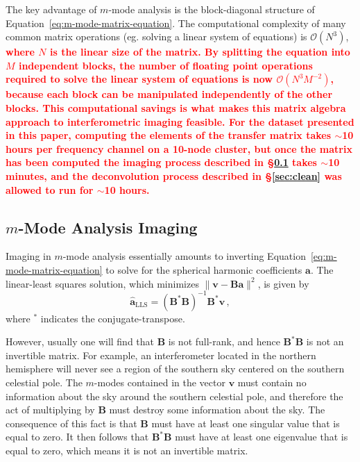 \documentclass[twocolumn]{aastex61}
\newcommand{\revision}[1]{\textcolor{red}{\textbf{#1}}}
\renewcommand{\b}{\pmb}
\begin{document}
The key advantage of $m$-mode analysis is the block-diagonal structure of
Equation~\ref{eq:m-mode-matrix-equation}. The computational complexity of many common matrix
operations (eg. solving a linear system of equations) is $\mathcal{O}(N^3)$, \revision{where $N$ is
the linear size of the matrix.  By splitting the equation into $M$ independent blocks, the number of
floating point operations required to solve the linear system of equations is now
$\mathcal{O}(N^3M^{-2})$, because each block can be manipulated independently of the other blocks.
This computational savings is what makes this matrix algebra approach to interferometric imaging
feasible. For the dataset presented in this paper, computing the elements of the transfer matrix
takes $\sim$10 hours per frequency channel on a 10-node cluster, but once the matrix has been
computed the imaging process described in \S\ref{sec:mmode-imaging} takes $\sim$10 minutes, and the
deconvolution process described in \S\ref{sec:clean} was allowed to run for $\sim$10 hours.}

\subsection{$m$-Mode Analysis Imaging}\label{sec:mmode-imaging}

Imaging in $m$-mode analysis essentially amounts to inverting
Equation~\ref{eq:m-mode-matrix-equation} to solve for the spherical harmonic coefficients $\b a$.
The linear-least squares solution, which minimizes $\|\b v - \b B\b a\|^2$, is given by
\begin{equation}
    \b{\hat a}_\text{LLS} = (\b B^*\b B)^{-1}\b B^*\b v\,,
\end{equation}
where $^*$ indicates the conjugate-transpose.

However, usually one will find that $\b B$ is not full-rank, and hence $\b B^*\b B$ is not an
invertible matrix. For example, an interferometer located in the northern hemisphere will never see
a region of the southern sky centered on the southern celestial pole. The $m$-modes contained in the
vector $\b v$ must contain no information about the sky around the southern celestial pole, and
therefore the act of multiplying by $\b B$ must destroy some information about the sky. The
consequence of this fact is that $\b B$ must have at least one singular value that is equal to zero.
It then follows that $\b B^*\b B$ must have at least one eigenvalue that is equal to zero, which
means it is not an invertible matrix.
\end{document}
